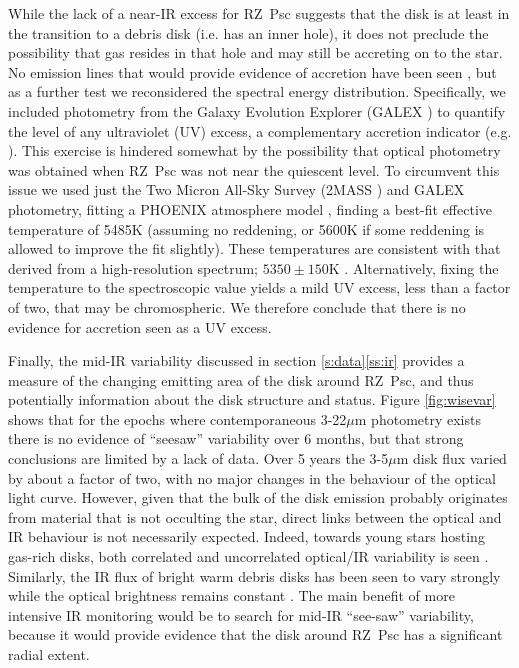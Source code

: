 \documentclass[]{rsos}
\begin{document}
While the lack of a near-IR excess for RZ~Psc suggests that the disk is at least in
the transition to a debris disk (i.e. has an inner hole), it does not preclude the
possibility that gas resides in that hole and may still be accreting on to the star. No
emission lines that would provide evidence of accretion have been seen
\cite{2013Ap.....56..453P,2014A&A...563A.139P}, but as a further test we reconsidered the
spectral energy distribution. Specifically, we included photometry from the Galaxy
Evolution Explorer (GALEX \cite{2003SPIE.4854..336M}) to quantify the level of any
ultraviolet (UV) excess, a complementary accretion indicator
(e.g. \cite{1998ApJ...509..802C}). This exercise is hindered somewhat by the possibility
that optical photometry was obtained when RZ~Psc was not near the quiescent level. To
circumvent this issue we used just the Two Micron All-Sky Survey (2MASS
\cite{2003tmc..book.....C}) and GALEX photometry, fitting a PHOENIX atmosphere model
\cite{2005ESASP.576..565B}, finding a best-fit effective temperature of 5485K (assuming
no reddening, or 5600K if some reddening is allowed to improve the fit slightly). These
temperatures are consistent with that derived from a high-resolution spectrum;
$5350 \pm 150$K \cite{2014A&A...563A.139P}. Alternatively, fixing the temperature to the
spectroscopic value yields a mild UV excess, less than a factor of two, that may be
chromospheric. We therefore conclude that there is no evidence for accretion seen as a UV
excess.

Finally, the mid-IR variability discussed in section \ref{s:data}\ref{ss:ir} provides a
measure of the changing emitting area of the disk around RZ~Psc, and thus potentially
information about the disk structure and status. Figure \ref{fig:wisevar} shows that for
the epochs where contemporaneous 3-22$\mu$m photometry exists there is no evidence of
``seesaw'' variability over 6 months, but that strong conclusions are limited by a lack
of data. Over 5 years the 3-5$\mu$m disk flux varied by about a factor of two, with no
major changes in the behaviour of the optical light curve. However, given that the bulk
of the disk emission probably originates from material that is not occulting the star,
direct links between the optical and IR behaviour is not necessarily expected. Indeed,
towards young stars hosting gas-rich disks, both correlated and uncorrelated optical/IR
variability is seen \cite{2014AJ....147...82C}. Similarly, the IR flux of bright warm
debris disks has been seen to vary strongly while the optical brightness remains constant
\cite{2015ApJ...805...77M}. The main benefit of more intensive IR monitoring would be to
search for mid-IR ``see-saw'' variability, because it would provide evidence that the
disk around RZ~Psc has a significant radial extent.
\end{document}
